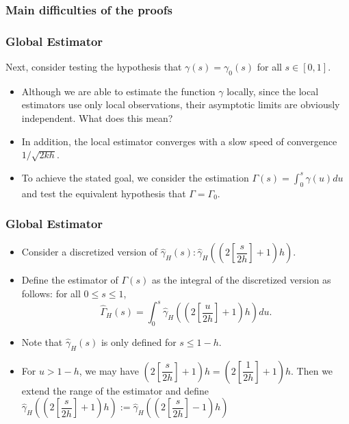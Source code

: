 \documentclass{beamer}
\newcommand{\suit}[1]{\left(#1\right)}
\begin{document}
\begin{frame}
    \frametitle{Main difficulties of the proofs}

    

\end{frame}




\begin{frame}
    \frametitle{Global Estimator}
Next, consider testing the hypothesis that $\gamma(s)=\gamma_0(s)$ for all $s\in [0,1]$.

\bigskip

\begin{itemize}
    \item Although we are able to estimate the function $\gamma$ locally, since the local estimators use only local observations, their asymptotic limits are obviously independent. {\color{red} What does this mean?}
    \item In addition, the local estimator converges with a slow speed of convergence $1/\sqrt{2kh}$.
    \item  To achieve the stated goal, we consider the estimation $\Gamma(s)=\int_{0}^{s}\gamma(u)du$ and test the equivalent hypothesis that $\Gamma=\Gamma_0$.
\end{itemize}
\end{frame}

\begin{frame}
    \frametitle{Global Estimator}

    \begin{itemize}
        \item      Consider a discretized version of $\hat{\gamma}_H(s): \hat{\gamma}_H\suit{(2[\dfrac{s}{2h}]+1)h}$.
        \smallskip
        \item      Define the estimator of $\Gamma(s)$ as the integral of the discretized version as follows: for all $0\le s\le 1$,
        $$
        \hat{\Gamma}_{H}(s)=\int_{0}^{s} \hat{\gamma}_{H}\left(\left(2\left[\frac{u}{2 h}\right]+1\right) h\right) d u.
        $$
        \smallskip
        \item Note that $\hat{\gamma}_H(s)$ is only defined for $s\le 1-h$.
        \smallskip
        \item For $u>1-h$, we may have $(2[\dfrac{s}{2h}]+1)h=(2[\dfrac{1}{2h}]+1)h$. Then we extend the range of the estimator and define $\hat{\gamma}_H((2[\dfrac{s}{2h}]+1)h):=\hat{\gamma}_H((2[\dfrac{s}{2h}]-1)h)$
    \end{itemize}


\end{frame}
\end{document}

